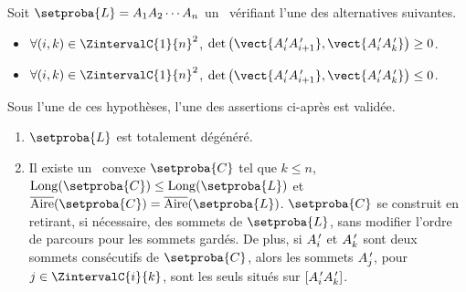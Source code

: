 \begin{fact} \label{conv-from-non-neg-det}
    Soit $\setproba{L} = A_1 A_2 \cdots A_n$ un \ncycle\ vérifiant l'une des alternatives suivantes.
	\begin{itemize}
		\item $\forall (i, k) \in \ZintervalC{1}{n}^2$,
		$\det \big( \vect{\primeit{A}_i \primeit{A}_{i+1}}, \vect{\primeit{A}_i \primeit{A}_k} \big) \geq 0$.

		\item $\forall (i, k) \in \ZintervalC{1}{n}^2$,
		$\det \big( \vect{\primeit{A}_i \primeit{A}_{i+1}}, \vect{\primeit{A}_i \primeit{A}_k} \big) \leq 0$.
    \end{itemize}
    
    Sous l'une de ces hypothèses, l'une des assertions ci-après est validée.
	\begin{enumerate}[label=\roman*.]
		\item $\setproba{L}$ est totalement dégénéré.

		\item Il existe un \kgone\ convexe $\setproba{C}$ tel que
		$k \leq n$, 
		$\cyclelen{\setproba{C}} \leq \cyclelen{\setproba{L}}$
		et
		$\sarea{\setproba{C}} = \sarea{\setproba{L}}$.
		$\setproba{C}$ se construit en retirant, si nécessaire, des sommets de $\setproba{L}$, sans modifier l'ordre de parcours pour les sommets gardés.
		De plus,
		si $A^{\,\prime}_i$ et $A^{\,\prime}_k$ sont deux sommets consécutifs de $\setproba{C}$,
		alors les sommets $A^{\,\prime}_j$, pour $j \in \ZintervalC{i}{k}$, sont les seuls situés sur $[A^{\,\prime}_i A^{\,\prime}_k]$.
    \end{enumerate}
\end{fact}


